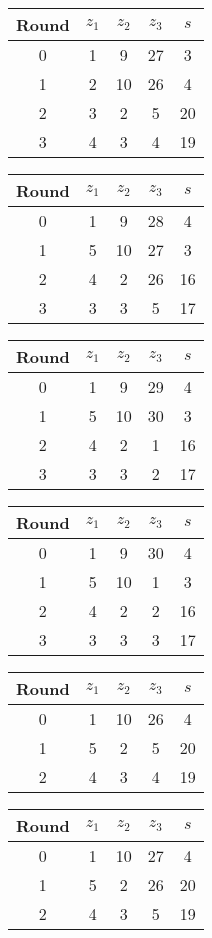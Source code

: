 \begin{multicols}{2}
\begin{tabular}{c | c | c | c | c }
Round & $z_1$ & $z_2$ & $z_3$ & $s$ \\
\hline
0 & 1 & 9 & 27 & 3 \\
1 & 2 & 10 & 26 & 4 \\
2 & 3 & 2 & 5 & 20 \\
3 & 4 & 3 & 4 & 19
\end{tabular}


\begin{tabular}{c | c | c | c | c }
Round & $z_1$ & $z_2$ & $z_3$ & $s$ \\
\hline
0 & 1 & 9 & 28 & 4 \\
1 & 5 & 10 & 27 & 3 \\
2 & 4 & 2 & 26 & 16 \\
3 & 3 & 3 & 5 & 17
\end{tabular}


\begin{tabular}{c | c | c | c | c }
Round & $z_1$ & $z_2$ & $z_3$ & $s$ \\
\hline
0 & 1 & 9 & 29 & 4 \\
1 & 5 & 10 & 30 & 3 \\
2 & 4 & 2 & 1 & 16 \\
3 & 3 & 3 & 2 & 17
\end{tabular}


\begin{tabular}{c | c | c | c | c }
Round & $z_1$ & $z_2$ & $z_3$ & $s$ \\
\hline
0 & 1 & 9 & 30 & 4 \\
1 & 5 & 10 & 1 & 3 \\
2 & 4 & 2 & 2 & 16 \\
3 & 3 & 3 & 3 & 17
\end{tabular}


\begin{tabular}{c | c | c | c | c }
Round & $z_1$ & $z_2$ & $z_3$ & $s$ \\
\hline
0 & 1 & 10 & 26 & 4 \\
1 & 5 & 2 & 5 & 20 \\
2 & 4 & 3 & 4 & 19
\end{tabular}


\begin{tabular}{c | c | c | c | c }
Round & $z_1$ & $z_2$ & $z_3$ & $s$ \\
\hline
0 & 1 & 10 & 27 & 4 \\
1 & 5 & 2 & 26 & 20 \\
2 & 4 & 3 & 5 & 19
\end{tabular}



\end{multicols}
